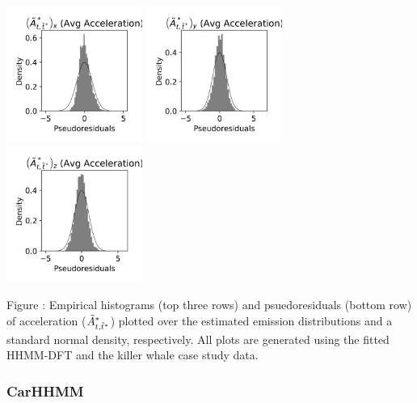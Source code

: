 \documentclass{article}
\begin{document}
\begin{center}
        \includegraphics[width=1.75in]{../Plots/HHMM_psedoresids_Ax.png}
        \includegraphics[width=1.75in]{../Plots/HHMM_psedoresids_Ay.png}
        \includegraphics[width=1.75in]{../Plots/HHMM_psedoresids_Az.png}
        \end{center}
        
        \noindent Figure : Empirical histograms (top three rows) and psuedoresiduals (bottom row) of acceleration ($\tilde{A}^*_{t,\tilde t^*}$) plotted over the estimated emission distributions and a standard normal density, respectively. All plots are generated using the fitted HHMM-DFT and the killer whale case study data.
        \addtocounter{fignum}{1}
        
        \newpage
        
        \subsubsection{CarHHMM}
        
\end{document}
